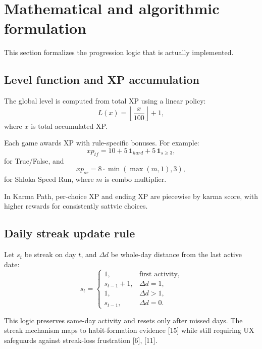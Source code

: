 \documentclass[conference]{IEEEtran}
\begin{document}
\section{Mathematical and algorithmic formulation}
This section formalizes the progression logic that is actually implemented.

\subsection{Level function and XP accumulation}
The global level is computed from total XP using a linear policy:
\begin{equation}
L(x) = \left\lfloor \frac{x}{100} \right\rfloor + 1,
\label{eq:level}
\end{equation}
where $x$ is total accumulated XP.

Each game awards XP with rule-specific bonuses. For example:
\begin{equation}
xp_{tf} = 10 + 5\,\mathbf{1}_{hard} + 5\,\mathbf{1}_{s \ge 3},
\label{eq:tfxp}
\end{equation}
for True/False, and
\begin{equation}
xp_{sr} = 8\cdot\min(\max(m,1),3),
\label{eq:srxp}
\end{equation}
for Shloka Speed Run, where $m$ is combo multiplier.

In Karma Path, per-choice XP and ending XP are piecewise by karma score, with higher rewards for consistently sattvic choices.

\subsection{Daily streak update rule}
Let $s_t$ be streak on day $t$, and $\Delta d$ be whole-day distance from the last active date:
\begin{equation}
s_t=
\begin{cases}
1, & \text{first activity}, \\
s_{t-1}+1, & \Delta d = 1, \\
1, & \Delta d > 1, \\
s_{t-1}, & \Delta d = 0.
\end{cases}
\label{eq:streak}
\end{equation}

This logic preserves same-day activity and resets only after missed days. The streak mechanism maps to habit-formation evidence [15] while still requiring UX safeguards against streak-loss frustration [6], [11].
\end{document}
